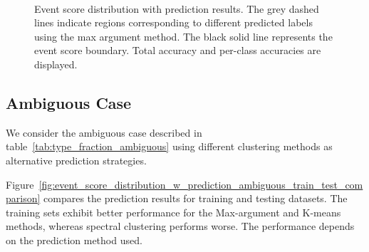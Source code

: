 \documentclass[12pt]{article}
\begin{document}
\begin{figure}[htpb]
{            } \\  
            \caption{Event score distribution with prediction results. The grey dashed lines indicate regions corresponding to different predicted labels using the max argument method. The black solid line represents the event score boundary. Total accuracy and per-class accuracies are displayed.}  
            \label{fig:event_score_distribution_w_prediction_dominated_1_train_test_comparison}  
        \end{figure}  
    \subsection{Ambiguous Case}%
    \label{sub:ambiguous_case_train_test_comparison}
        We consider the ambiguous case described in table~\ref{tab:type_fraction_ambiguous} using different clustering methods as alternative prediction strategies.  

        Figure~\ref{fig:event_score_distribution_w_prediction_ambiguous_train_test_comparison} compares the prediction results for training and testing datasets. The training sets exhibit better performance for the Max-argument and K-means methods, whereas spectral clustering performs worse. The performance depends on the prediction method used.  
\end{document}
